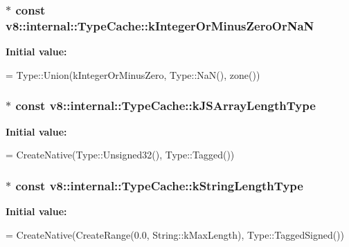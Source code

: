 \subsubsection[{\texorpdfstring{k\+Integer\+Or\+Minus\+Zero\+Or\+NaN}{kIntegerOrMinusZeroOrNaN}}]{$\ast$ const v8\+::internal\+::\+Type\+Cache\+::k\+Integer\+Or\+Minus\+Zero\+Or\+NaN}\hypertarget{classv8_1_1internal_1_1_type_cache_af28103fde77f8333b7d0266d58173f20}{}\label{classv8_1_1internal_1_1_type_cache_af28103fde77f8333b7d0266d58173f20}
{\bfseries Initial value\+:}
\begin{DoxyCode}
=
      Type::Union(kIntegerOrMinusZero, Type::NaN(), zone())
\end{DoxyCode}
\subsubsection[{\texorpdfstring{k\+J\+S\+Array\+Length\+Type}{kJSArrayLengthType}}]{$\ast$ const v8\+::internal\+::\+Type\+Cache\+::k\+J\+S\+Array\+Length\+Type}\hypertarget{classv8_1_1internal_1_1_type_cache_ae9791d8adc7903a08b8f1eb5fa11a307}{}\label{classv8_1_1internal_1_1_type_cache_ae9791d8adc7903a08b8f1eb5fa11a307}
{\bfseries Initial value\+:}
\begin{DoxyCode}
=
      CreateNative(Type::Unsigned32(), Type::Tagged())
\end{DoxyCode}
\subsubsection[{\texorpdfstring{k\+String\+Length\+Type}{kStringLengthType}}]{$\ast$ const v8\+::internal\+::\+Type\+Cache\+::k\+String\+Length\+Type}\hypertarget{classv8_1_1internal_1_1_type_cache_a1d532887027acc2e53697fca9f1a6a02}{}\label{classv8_1_1internal_1_1_type_cache_a1d532887027acc2e53697fca9f1a6a02}
{\bfseries Initial value\+:}
\begin{DoxyCode}
=
      CreateNative(CreateRange(0.0, String::kMaxLength), Type::TaggedSigned())
\end{DoxyCode}
